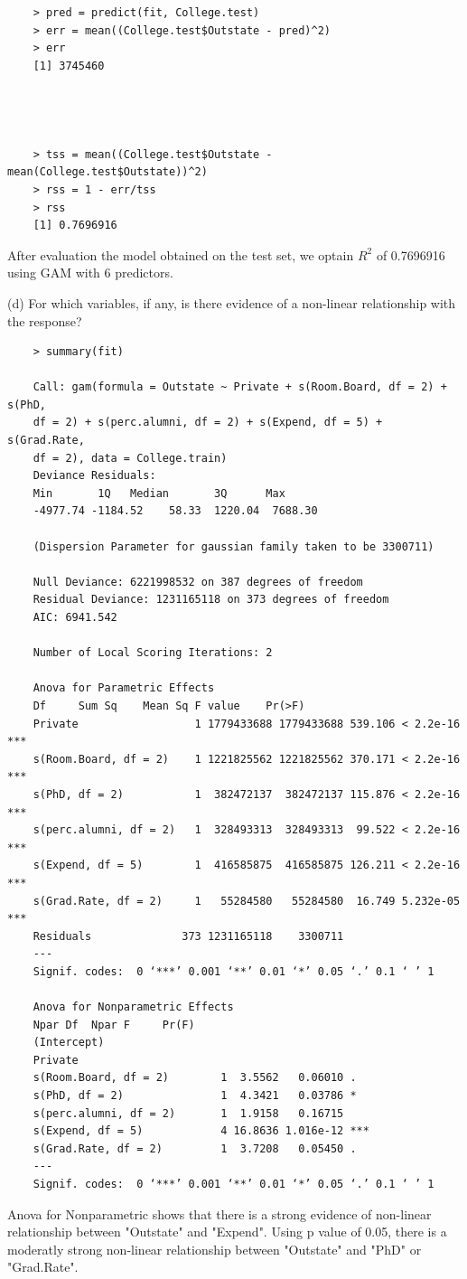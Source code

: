 \documentclass{article}
\begin{document}
\begin{program}
	\begin{verbatim}
	> pred = predict(fit, College.test)
	> err = mean((College.test$Outstate - pred)^2)
	> err
	[1] 3745460




	> tss = mean((College.test$Outstate - mean(College.test$Outstate))^2)
	> rss = 1 - err/tss
	> rss
	[1] 0.7696916
	\end{verbatim}
\end{program}

After evaluation the model obtained on the test set, we optain $R^2$ of 0.7696916 using GAM with 6 predictors.


\newpage

(d) For which variables, if any, is there evidence of a non-linear relationship with the response?


\begin{program}
	\begin{verbatim}
	> summary(fit)
	
	Call: gam(formula = Outstate ~ Private + s(Room.Board, df = 2) + s(PhD, 
	df = 2) + s(perc.alumni, df = 2) + s(Expend, df = 5) + s(Grad.Rate, 
	df = 2), data = College.train)
	Deviance Residuals:
	Min       1Q   Median       3Q      Max 
	-4977.74 -1184.52    58.33  1220.04  7688.30 
	
	(Dispersion Parameter for gaussian family taken to be 3300711)
	
	Null Deviance: 6221998532 on 387 degrees of freedom
	Residual Deviance: 1231165118 on 373 degrees of freedom
	AIC: 6941.542 
	
	Number of Local Scoring Iterations: 2 
	
	Anova for Parametric Effects
	Df     Sum Sq    Mean Sq F value    Pr(>F)    
	Private                  1 1779433688 1779433688 539.106 < 2.2e-16 ***
	s(Room.Board, df = 2)    1 1221825562 1221825562 370.171 < 2.2e-16 ***
	s(PhD, df = 2)           1  382472137  382472137 115.876 < 2.2e-16 ***
	s(perc.alumni, df = 2)   1  328493313  328493313  99.522 < 2.2e-16 ***
	s(Expend, df = 5)        1  416585875  416585875 126.211 < 2.2e-16 ***
	s(Grad.Rate, df = 2)     1   55284580   55284580  16.749 5.232e-05 ***
	Residuals              373 1231165118    3300711                      
	---
	Signif. codes:  0 ‘***’ 0.001 ‘**’ 0.01 ‘*’ 0.05 ‘.’ 0.1 ‘ ’ 1
	
	Anova for Nonparametric Effects
	Npar Df  Npar F     Pr(F)    
	(Intercept)                                         
	Private                                             
	s(Room.Board, df = 2)        1  3.5562   0.06010 .  
	s(PhD, df = 2)               1  4.3421   0.03786 *  
	s(perc.alumni, df = 2)       1  1.9158   0.16715    
	s(Expend, df = 5)            4 16.8636 1.016e-12 ***
	s(Grad.Rate, df = 2)         1  3.7208   0.05450 .  
	---
	Signif. codes:  0 ‘***’ 0.001 ‘**’ 0.01 ‘*’ 0.05 ‘.’ 0.1 ‘ ’ 1
	\end{verbatim}
\end{program}

Anova for Nonparametric shows that there is a strong evidence of non-linear relationship between "Outstate" and "Expend".
Using p value of 0.05, there is a moderatly strong non-linear relationship between "Outstate" and "PhD" or "Grad.Rate".
\end{document}
